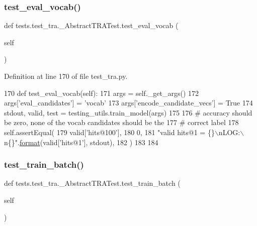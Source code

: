 \subsubsection{\texorpdfstring{test\+\_\+eval\+\_\+vocab()}{test\_eval\_vocab()}}
{\footnotesize\ttfamily def tests.\+test\+\_\+tra.\+\_\+\+Abstract\+T\+R\+A\+Test.\+test\+\_\+eval\+\_\+vocab (\begin{DoxyParamCaption}\item[{}]{self }\end{DoxyParamCaption})}



Definition at line 170 of file test\+\_\+tra.\+py.


\begin{DoxyCode}
170     \textcolor{keyword}{def }test\_eval\_vocab(self):
171         args = self.\_get\_args()
172         args[\textcolor{stringliteral}{'eval\_candidates'}] = \textcolor{stringliteral}{'vocab'}
173         args[\textcolor{stringliteral}{'encode\_candidate\_vecs'}] = \textcolor{keyword}{True}
174         stdout, valid, test = testing\_utils.train\_model(args)
175 
176         \textcolor{comment}{# accuracy should be zero, none of the vocab candidates should be the}
177         \textcolor{comment}{# correct label}
178         self.assertEqual(
179             valid[\textcolor{stringliteral}{'hits@100'}],
180             0,
181             \textcolor{stringliteral}{"valid hits@1 = \{\}\(\backslash\)nLOG:\(\backslash\)n\{\}"}.\hyperlink{namespaceparlai_1_1chat__service_1_1services_1_1messenger_1_1shared__utils_a32e2e2022b824fbaf80c747160b52a76}{format}(valid[\textcolor{stringliteral}{'hits@1'}], stdout),
182         )
183 
184 
\end{DoxyCode}
\mbox{\label{classtests_1_1test__tra_1_1__AbstractTRATest_a00c2874cb33f155fa829cc7783d5d724}} 
\subsubsection{\texorpdfstring{test\+\_\+train\+\_\+batch()}{test\_train\_batch()}}
{\footnotesize\ttfamily def tests.\+test\+\_\+tra.\+\_\+\+Abstract\+T\+R\+A\+Test.\+test\+\_\+train\+\_\+batch (\begin{DoxyParamCaption}\item[{}]{self }\end{DoxyParamCaption})}




